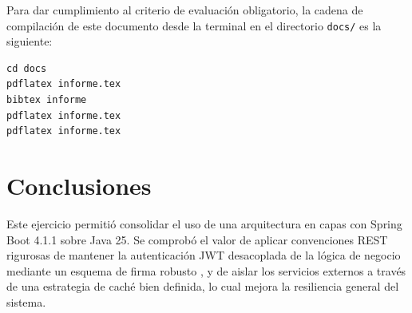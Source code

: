 \documentclass[11pt,a4paper]{article}
\begin{document}
Para dar cumplimiento al criterio de evaluación obligatorio, la cadena de compilación de este documento desde la terminal en el directorio \texttt{docs/} es la siguiente:

\begin{lstlisting}[style=bash]
cd docs
pdflatex informe.tex
bibtex informe
pdflatex informe.tex
pdflatex informe.tex
\end{lstlisting}

\section{Conclusiones}

Este ejercicio permitió consolidar el uso de una arquitectura en capas con Spring Boot 4.1.1 sobre Java 25. Se comprobó el valor de aplicar convenciones REST rigurosas de mantener la autenticación JWT desacoplada de la lógica de negocio mediante un esquema de firma robusto , y de aislar los servicios externos a través de una estrategia de caché bien definida, lo cual mejora la resiliencia general del sistema.



\end{document}
